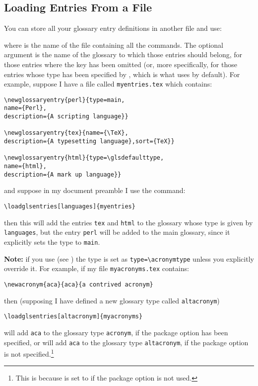 \documentclass{nlctdoc}
\newcommand*{\gloskey}[2][newglossaryentry]{\csopt{#1}{#2}}
\begin{document}
\subsection{Loading Entries From a File}
\label{sec:loadglsentries}

You can store all your glossary entry definitions in another
file and use:
\begin{definition}[\DescribeMacro{\loadglsentries}]
\end{definition}
where  is the name of the file containing all the
 commands. The optional argument
 is the name of the glossary to which those entries
should belong, for those entries where the \gloskey{type} key has 
been omitted (or, more specifically, for those entries whose
type has been specified by , which is what
 uses by default). For example, suppose I have
a file called \texttt{myentries.tex} which contains:
\begin{verbatim}
\newglossaryentry{perl}{type=main,
name={Perl},
description={A scripting language}}

\newglossaryentry{tex}{name={\TeX},
description={A typesetting language},sort={TeX}}

\newglossaryentry{html}{type=\glsdefaulttype,
name={html},
description={A mark up language}}
\end{verbatim}
and suppose in my document preamble I use the command:
\begin{verbatim}
\loadglsentries[languages]{myentries}
\end{verbatim}
then this will add the entries \texttt{tex} and \texttt{html}
to the glossary whose type is given by \texttt{languages}, but
the entry \texttt{perl} will be added to the main glossary, since
it explicitly sets the type to \texttt{main}.

\textbf{Note:} if you use  (see
) the type is set as
\verb|type=\acronymtype| unless you explicitly override it. For
example, if my file \texttt{myacronyms.tex} contains:
\begin{verbatim}
\newacronym{aca}{aca}{a contrived acronym}
\end{verbatim}
then (supposing I have defined a new glossary type called
\texttt{altacronym})
\begin{verbatim}
\loadglsentries[altacronym]{myacronyms}
\end{verbatim}
will add \texttt{aca} to the glossary type \texttt{acronym}, if the
package option  has been specified, or will add
\texttt{aca} to the glossary type \texttt{altacronym}, if the
package option  is not specified.\footnote{This is
because  is set to  if the
 package option is not used.}
\end{document}
